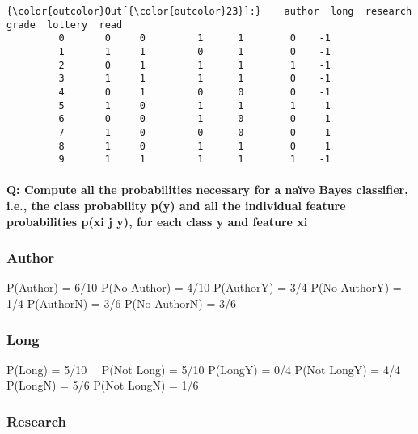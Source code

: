 \documentclass[11pt]{article}
\begin{document}
\begin{Verbatim}[commandchars=\\\{\}]
{\color{outcolor}Out[{\color{outcolor}23}]:}    author  long  research  grade  lottery  read
         0       0     0         1      1        0    -1
         1       1     1         0      1        0    -1
         2       0     1         1      1        1    -1
         3       1     1         1      1        0    -1
         4       0     1         0      0        0    -1
         5       1     0         1      1        1     1
         6       0     0         1      0        0     1
         7       1     0         0      0        0     1
         8       1     0         1      1        0     1
         9       1     1         1      1        1    -1
\end{Verbatim}
            
    \paragraph{Q: Compute all the probabilities necessary for a naïve Bayes
classifier, i.e., the class probability p(y) and all the individual
feature probabilities p(xi j y), for each class y and feature
xi}\label{q-compute-all-the-probabilities-necessary-for-a-nauxefve-bayes-classifier-i.e.-the-class-probability-py-and-all-the-individual-feature-probabilities-pxi-j-y-for-each-class-y-and-feature-xi}

    \subsubsection{Author}\label{author}

    P(Author) = 6/10 P(No Author) = 4/10 P(Author\textbar{}Y) = 3/4 P(No
Author\textbar{}Y) = 1/4 P(Author\textbar{}N) = 3/6 P(No
Author\textbar{}N) = 3/6

    \subsubsection{Long}\label{long}

    P(Long) = 5/10~~ P(Not Long) = 5/10 P(Long\textbar{}Y) = 0/4 P(Not
Long\textbar{}Y) = 4/4 P(Long\textbar{}N) = 5/6 P(Not Long\textbar{}N) =
1/6~~~~

    \subsubsection{Research}\label{research}
\end{document}
